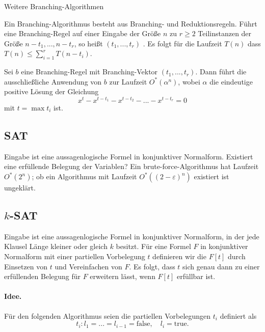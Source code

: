 \begin{section}{Weitere Branching-Algorithmen}


  Ein Branching-Algorithmus besteht aus Branching- und Reduktionsregeln. Führt eine Branching-Regel auf einer Eingabe der Größe \(n\) zu \(r \geq 2\) Teilinstanzen der Größe \(n - t_1, ..., n - t_r\), so heißt \( (t_1,...,t_r) \) . Es folgt für die Laufzeit \(T(n)\) dass \(T(n) \leq \sum_{i=1}^r T(n-t_i)\).

  \begin{theorem} \label{satzLaufzeit}
    Sei \(b\) eine Branching-Regel mit Branching-Vektor \( (t_1,...,t_r) \). Dann führt die ausschließliche Anwendung von \(b\) zur Laufzeit \(O^*(\alpha^n)\), wobei \(\alpha\) die eindeutige positive Lösung der Gleichung \[ x^t - x^{t-t_1} - x^{t - t_2} - ... - x^{t - t_r} = 0 \] mit \(t = \max t_i\) ist.
  \end{theorem}

\subsection{SAT}

  Eingabe ist eine aussagenlogische Formel in konjunktiver Normalform. Existiert eine erfüllende Belegung der Variablen? Ein brute-force-Algorithmus hat Laufzeit \(O^*(2^n)\); ob ein Algorithmus mit Laufzeit \(O^*( (2-\varepsilon)^n )\) existiert ist ungeklärt.

\subsection{$k$-SAT}

  Eingabe ist eine aussagenlogische Formel in konjunktiver Normalform, in der jede Klausel Länge kleiner oder gleich \(k\) besitzt. Für eine Formel \(F\) in konjunktiver Normalform mit einer partiellen Vorbelegung \(t\) definieren wir die  \(F[t]\) durch Einsetzen von \(t\) und Vereinfachen von \(F\). Es folgt, dass \(t\) sich genau dann zu einer erfüllenden Belegung für \(F\) erweitern lässt, wenn \(F[t]\) erfüllbar ist.

  \paragraph{Idee.} Für den folgenden Algorithmus seien die partiellen Vorbelegungen \(t_i\) definiert als \[ t_i: l_1 = ... = l_{i-1} = \text{false}, \quad l_i = \text{true}. \]


\end{section}
